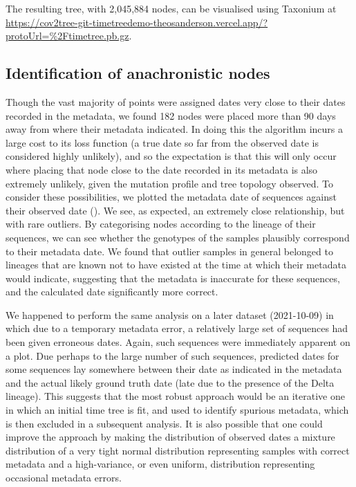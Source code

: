 The resulting tree, with 2,045,884 nodes, can be visualised using Taxonium at \url{https://cov2tree-git-timetreedemo-theosanderson.vercel.app/?protoUrl=\%2Ftimetree.pb.gz}.


\subsection*{Identification of anachronistic nodes}

Though the vast majority of points were assigned dates very close to their dates recorded in the metadata, we found 182 nodes were placed more than 90 days away from where their metadata indicated. In doing this the algorithm incurs a large cost to its loss function (a true date so far from the observed date is considered highly unlikely), and so the expectation is that this will only occur where placing that node close to the date recorded in its metadata is also extremely unlikely, given the mutation profile and tree topology observed. To consider these possibilities, we plotted the metadata date of sequences against their observed date (). We see, as expected, an extremely close relationship, but with rare outliers. By categorising nodes according to the lineage of their sequences, we can see whether the genotypes of the samples plausibly correspond to their metadata date. We found that outlier samples in general belonged to lineages that are known not to have existed at the time at which their metadata would indicate, suggesting that the metadata is inaccurate for these sequences, and the calculated date significantly more correct. 

We happened to perform the same analysis on a later dataset (2021-10-09) in which due to a temporary metadata error, a relatively large set of sequences had been given erroneous dates. Again, such sequences were immediately apparent on a plot. Due perhaps to the large number of such sequences, predicted dates for some sequences lay somewhere between their date as indicated in the metadata and the actual likely ground truth date (late due to the presence of the Delta lineage). This suggests that the most robust approach would be an iterative one in which an initial time tree is fit, and used to identify  spurious metadata, which is then excluded in a subsequent analysis. It is also possible that one could improve the approach by making the distribution of observed dates a mixture distribution of a very tight normal distribution representing samples with correct metadata and a high-variance, or even uniform, distribution representing occasional metadata errors.

